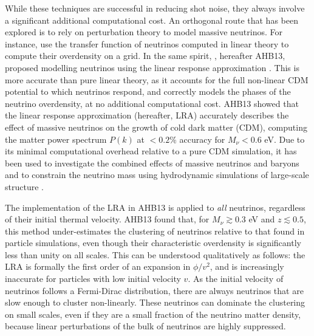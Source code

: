 \documentclass[useAMS, usenatbib]{mnras}
\begin{document}

While these techniques are successful in reducing shot noise, they always involve a significant additional computational cost. An orthogonal route that has been explored is to rely on perturbation theory to model massive neutrinos. For instance, \cite{Brandbyge_2009} use the transfer function of neutrinos computed in linear theory to compute their overdensity on a grid. In the same spirit, \cite{AHB}, hereafter AHB13, proposed modelling neutrinos using the linear response approximation \citep{Bond_1980, Ma_1994}. This is more accurate than pure linear theory, as it accounts for the full non-linear CDM potential to which neutrinos respond, and correctly models the phases of the neutrino overdensity, at no additional computational cost.
AHB13 showed that the linear response approximation (hereafter, LRA) accurately describes the effect of massive neutrinos on the growth of cold dark matter (CDM), computing the matter power spectrum $P(k)$ at $ < 0.2\%$ accuracy for $M_\nu < 0.6$ eV. Due to its minimal computational overhead relative to a pure CDM simulation, it has been used to investigate the combined effects of massive neutrinos and baryons \citep{Mummery_2017} and to constrain the neutrino mass using hydrodynamic simulations of large-scale structure \citep{McCarthy_2018, McCarthy_2017}.

The implementation of the LRA in AHB13 is applied to \emph{all} neutrinos, regardless of their initial thermal velocity. AHB13 found that, for $M_\nu \gtrsim 0.3$ eV and $z \lesssim 0.5$, this method under-estimates the clustering of neutrinos relative to that found in particle simulations, even though their characteristic overdensity is significantly less than unity on all scales. This can be understood qualitatively as follows: the LRA is formally the first order of an expansion in $\phi/v^2$, and is increasingly inaccurate for particles with low initial velocity $v$. As the initial velocity of neutrinos follows a Fermi-Dirac distribution, there are always neutrinos that are slow enough to cluster non-linearly. These neutrinos can dominate the clustering on small scales, even if they are a small fraction of the neutrino matter density, because linear perturbations of the bulk of neutrinos are highly suppressed.
\end{document}

